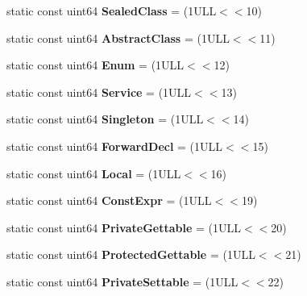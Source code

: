 \begin{DoxyCompactItemize}
\mbox{\label{class_entry_a52ebcc0cc1ada1d65110f17c5a53bae8}} 
static const uint64 {\bfseries Sealed\+Class} = (1\+U\+L\+L$<$$<$10)
\item 
\mbox{\label{class_entry_add1e67450bf4630c0f39319e4ab0ccb7}} 
static const uint64 {\bfseries Abstract\+Class} = (1\+U\+L\+L$<$$<$11)
\item 
\mbox{\label{class_entry_ad7939aa71a758ac6542eae7a751fa402}} 
static const uint64 {\bfseries Enum} = (1\+U\+L\+L$<$$<$12)
\item 
\mbox{\label{class_entry_a9547b8789d4e3947195c1d61f5e1a96a}} 
static const uint64 {\bfseries Service} = (1\+U\+L\+L$<$$<$13)
\item 
\mbox{\label{class_entry_a0d43729e0fcbde5bb4ab3a7f955a8414}} 
static const uint64 {\bfseries Singleton} = (1\+U\+L\+L$<$$<$14)
\item 
\mbox{\label{class_entry_acd4eca9e63c0bad3da6b88499d5ebc3e}} 
static const uint64 {\bfseries Forward\+Decl} = (1\+U\+L\+L$<$$<$15)
\item 
\mbox{\label{class_entry_a47c7253543344efc340813791cbcb168}} 
static const uint64 {\bfseries Local} = (1\+U\+L\+L$<$$<$16)
\item 
\mbox{\label{class_entry_a350fbfb8cd8d961df79bd67d74e9f23f}} 
static const uint64 {\bfseries Const\+Expr} = (1\+U\+L\+L$<$$<$19)
\item 
\mbox{\label{class_entry_a1ec4277e937f267164c4e89a3eabd59c}} 
static const uint64 {\bfseries Private\+Gettable} = (1\+U\+L\+L$<$$<$20)
\item 
\mbox{\label{class_entry_aa923493681980b707bfce77996f21268}} 
static const uint64 {\bfseries Protected\+Gettable} = (1\+U\+L\+L$<$$<$21)
\item 
\mbox{\label{class_entry_a9943c00555ee1577cbdbde3cf575dd3b}} 
static const uint64 {\bfseries Private\+Settable} = (1\+U\+L\+L$<$$<$22)
\item 
\mbox{\label{class_entry_a5483d74642fe0e648e4c5661921bf7f0}} 
$$
\end{DoxyCompactItemize}

